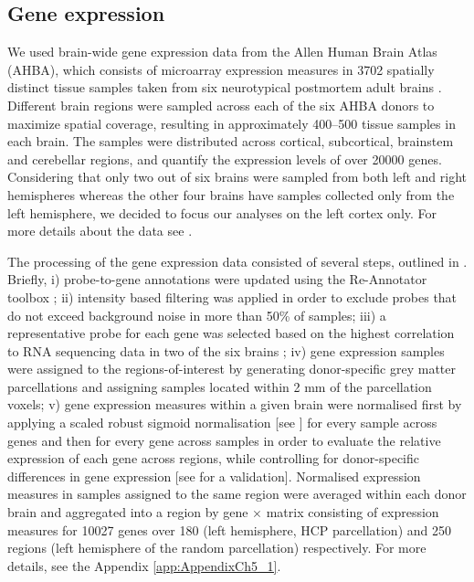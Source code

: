 \subsection{Gene expression}
\label{secGeneExpression}

We used brain-wide gene expression data from the Allen Human Brain Atlas (AHBA), which consists of microarray expression measures in 3702 spatially distinct tissue samples taken from six neurotypical postmortem adult brains \citep{Hawrylycz2012}. Different brain regions were sampled across each of the six AHBA donors to maximize spatial coverage, resulting in approximately 400--500 tissue samples in each brain. The samples were distributed across cortical, subcortical, brainstem and cerebellar regions, and quantify the expression levels of over \num{20000} genes. Considering that only two out of six brains were sampled from both left and right hemispheres whereas the other four brains have samples collected only from the left hemisphere, we decided to focus our analyses on the left cortex only. For more details about the data see \citep{Hawrylycz2012}.

The processing of the gene expression data consisted of several steps, outlined in \citep{Arnatkeviciute2019}. Briefly, i) probe-to-gene annotations were updated using the Re-Annotator toolbox \citep{Arloth2015}; ii) intensity based filtering was applied in order to exclude probes that do not exceed background noise in more than 50\% of samples; iii) a representative probe for each gene was selected based on the highest correlation to RNA sequencing data in two of the six brains \citep{Miller2014a}; iv) gene expression samples were assigned to the regions-of-interest by generating donor-specific grey matter parcellations and assigning samples located within 2 mm of the parcellation voxels; v) gene expression measures within a given brain were normalised first by applying a scaled robust sigmoid normalisation [see \citet{Arnatkeviciute2019}] for every sample across genes and then for every gene across samples in order to evaluate the relative expression of each gene across regions, while controlling for donor-specific differences in gene expression [see \citet{Arnatkeviciute2019} for a validation]. Normalised expression measures in samples assigned to the same region were averaged within each donor brain and aggregated into a region by gene $\times$ matrix consisting of expression measures for \num{10027} genes over 180 (left hemisphere, HCP parcellation) and 250 regions (left hemisphere of the random parcellation) respectively. For more details, see the Appendix  \ref{app:AppendixCh5_1}.

